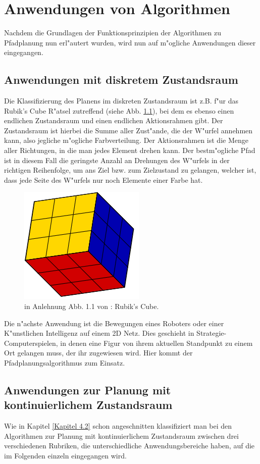 \chapter{Anwendungen von Algorithmen}
Nachdem die Grundlagen der Funktionsprinzipien der Algorithmen zu Pfadplanung nun erl"autert  wurden, wird nun auf m"ogliche Anwendungen dieser eingegangen.

\section{Anwendungen mit diskretem Zustandsraum}
Die Klassifizierung des Planens im  diskreten Zustandsraum ist z.B. f"ur das Rubik's Cube R"atsel zutreffend (siehe Abb. \ref{Abb. 5.1}), bei dem es ebenso einen endlichen Zustandsraum und einen endlichen Aktionsrahmen gibt. Der Zustandsraum ist hierbei die Summe aller Zust"ande, die der W"urfel annehmen kann, also jegliche m"ogliche Farbverteilung. Der Aktionsrahmen ist die Menge aller Richtungen, in die man jedes Element drehen kann. Der bestm"ogliche Pfad ist in diesem Fall die geringste Anzahl an Drehungen des W"urfels in der richtigen Reihenfolge, um ans Ziel bzw. zum Zielzustand zu gelangen, welcher ist, dass jede Seite des W"urfels nur noch Elemente einer Farbe hat.\cite[~S. 20]{Lav06}\\
\begin{figure}
	\centering
	\includegraphics[width=0.4\linewidth]{images/img229}
	\caption{in Anlehnung Abb. 1.1 von \cite[~S. 5]{Lav06}: Rubik's Cube.}
	\label{Abb. 5.1}
\end{figure}

Die n"achste Anwendung ist die Bewegungen eines Roboters oder einer K"unstlichen Intelligenz auf einem 2D Netz. Dies geschieht in Strategie-Computerspielen, in denen eine Figur von ihrem aktuellen Standpunkt zu einem Ort gelangen muss, der ihr zugewiesen wird. Hier kommt der Pfadplanungsalgorithmus zum Einsatz.\cite{cui2011based}%
\section{Anwendungen zur Planung mit kontinuierlichem Zustandsraum}
Wie in Kapitel \ref{Kapitel 4.2} schon angeschnitten klassifiziert man bei den Algorithmen zur Planung mit kontinuierlichem Zustandsraum zwischen drei verschiedenen Rubriken, die unterschiedliche Anwendungsbereiche haben, auf die im Folgenden einzeln eingegangen wird.
